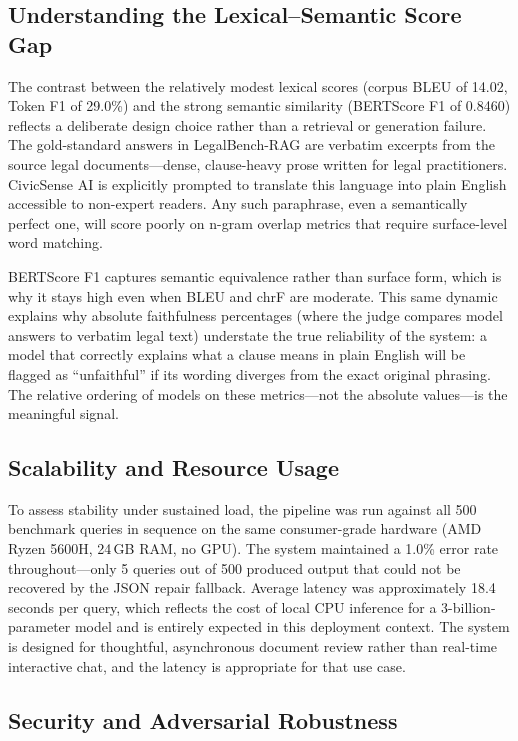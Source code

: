 \documentclass[conference]{IEEEtran}
\begin{document}
\subsection{Understanding the Lexical--Semantic Score Gap}
\label{sec:score_gap}

The contrast between the relatively modest lexical scores (corpus BLEU of 14.02, Token F1 of 29.0\%) and the strong semantic similarity (BERTScore F1 of 0.8460) reflects a deliberate design choice rather than a retrieval or generation failure. The gold-standard answers in LegalBench-RAG are verbatim excerpts from the source legal documents---dense, clause-heavy prose written for legal practitioners. CivicSense AI is explicitly prompted to translate this language into plain English accessible to non-expert readers. Any such paraphrase, even a semantically perfect one, will score poorly on n-gram overlap metrics that require surface-level word matching.

BERTScore F1 captures semantic equivalence rather than surface form, which is why it stays high even when BLEU and chrF are moderate. This same dynamic explains why absolute faithfulness percentages (where the judge compares model answers to verbatim legal text) understate the true reliability of the system: a model that correctly explains what a clause means in plain English will be flagged as ``unfaithful'' if its wording diverges from the exact original phrasing. The relative ordering of models on these metrics---not the absolute values---is the meaningful signal.

\subsection{Scalability and Resource Usage}
\label{sec:scalability}

To assess stability under sustained load, the pipeline was run against all 500 benchmark queries in sequence on the same consumer-grade hardware (AMD Ryzen 5600H, 24\,GB RAM, no GPU). The system maintained a 1.0\% error rate throughout---only 5 queries out of 500 produced output that could not be recovered by the JSON repair fallback. Average latency was approximately 18.4 seconds per query, which reflects the cost of local CPU inference for a 3-billion-parameter model and is entirely expected in this deployment context. The system is designed for thoughtful, asynchronous document review rather than real-time interactive chat, and the latency is appropriate for that use case.

\subsection{Security and Adversarial Robustness}
\label{sec:security}
\end{document}
